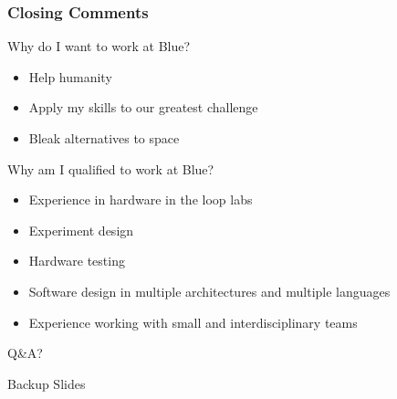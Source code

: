 \documentclass[aspectratio=169]{beamer}
\begin{document}
\begin{frame}
  \frametitle{Closing Comments}
  \begin{block}{Why do I want to work at Blue?}
    \begin{itemize}
    \item Help humanity
    \item Apply my skills to our greatest challenge
    \item Bleak alternatives to space
    \end{itemize}
  \end{block}

  \begin{block}{Why am I qualified to work at Blue?}
    \begin{itemize}
    \item Experience in hardware in the loop labs
    \item Experiment design
    \item Hardware testing
    \item Software design in multiple architectures and multiple
      languages
    \item Experience working with small and interdisciplinary teams
    \end{itemize}
  \end{block}
\end{frame}

\begin{frame}
\Huge{\centerline{Q\&A?}}
\end{frame}

\begin{frame}
\Huge{\centerline{Backup Slides}}
\end{frame}
\end{document}
